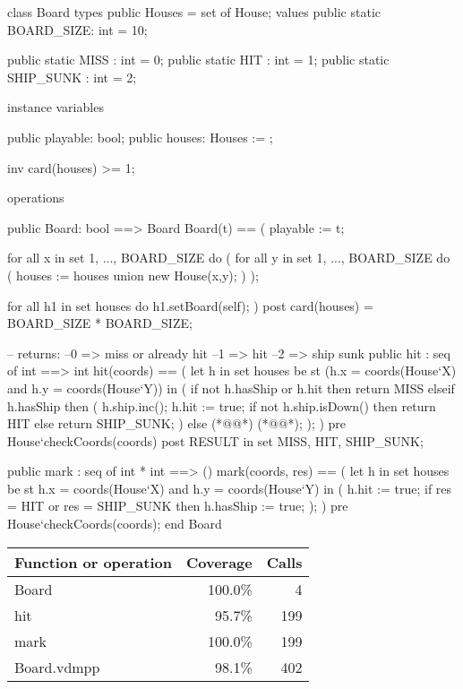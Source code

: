 \begin{vdm_al}
class Board
 types
  public Houses = set of House;
 values
  public static BOARD_SIZE: int = 10;
  
  public static MISS : int = 0;
  public static HIT : int = 1;
  public static SHIP_SUNK : int = 2;
 
 instance variables
  
  public playable: bool;
  public houses: Houses := {};
  
  inv card(houses) >= 1;
  
 operations
 
  public Board: bool ==> Board
   Board(t) == 
   (
    playable := t;
    
    for all x in set {1, ..., BOARD_SIZE}  do (
     for all y in set {1, ..., BOARD_SIZE} do (
      houses := houses union {new House(x,y)};
     )
    );
    
    for all h1 in set houses do h1.setBoard(self);
   )
  post card(houses) = BOARD_SIZE * BOARD_SIZE;
  
  -- returns:
  --0 => miss or already hit
  --1 => hit
  --2 => ship sunk
  public hit : seq of int ==> int
   hit(coords) ==
   (
    let h in set houses be st (h.x = coords(House`X) and h.y = coords(House`Y)) in (
     if not h.hasShip or h.hit then return MISS
     elseif h.hasShip then
      (
       h.ship.inc();
       h.hit := true;
       if not h.ship.isDown() then return HIT
       else return SHIP_SUNK;
      )
     else (*@@*) (*@@*);
    );
   )
   pre House`checkCoords(coords)   
   post RESULT in set {MISS, HIT, SHIP_SUNK};

  public mark : seq of int * int ==> ()
   mark(coords, res) ==
   (
    let h in set houses be st h.x = coords(House`X) and h.y = coords(House`Y) in (
     h.hit := true;
     if res = HIT or res = SHIP_SUNK then
      h.hasShip := true;
    );
   )
   pre House`checkCoords(coords);       
end Board
\end{vdm_al}
\bigskip
\begin{longtable}{|l|r|r|}
\hline
Function or operation & Coverage & Calls \\
\hline
\hline
Board & 100.0\% & 4 \\
\hline
hit & 95.7\% & 199 \\
\hline
mark & 100.0\% & 199 \\
\hline
\hline
Board.vdmpp & 98.1\% & 402 \\
\hline
\end{longtable}

